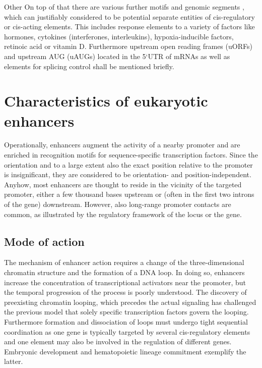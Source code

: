 \begin{mydescription}{0.5cm}
	\item[Other] On top of that there are various further motifs and genomic segments , which can justifiably considered to be potential separate entities of cis-regulatory or cis-acting elements. This includes response elements to a variety of factors like hormones, cytokines (interferones, interleukins), hypoxia-inducible factors, retinoic acid or vitamin D. Furthermore upstream open reading frames (uORFs) and upstream AUG (uAUGs) located in the 5\lq UTR of mRNAs \cite{Iacono2005,Kochetov2008} as well as elements for splicing control\cite{Wang2006} shall be mentioned briefly. 
\end{mydescription} 



\section{Characteristics of eukaryotic enhancers}
\label{chap:i:enhancers:enhancerdef}

Operationally, enhancers augment the activity of a nearby promoter and are enriched in recognition motifs for sequence-specific transcription factors. Since the orientation and to a large extent also the exact position relative to the promoter is insignificant, they are considered to be orientation- and position-independent. Anyhow, most enhancers are thought to reside in the vicinity of the targeted promoter, either a few thousand bases upstream or (often in the first two introns of the gene) downstream. However, also long-range promoter contacts are common\cite{Sanyal2012,Mifsud2015}, as illustrated by the regulatory framework of the  locus \cite{Fulco2016} or the  gene\cite{Lettice2003}. 

\subsection{Mode of action} 
\label{chap:i:enhancers:moa}
The mechanism of enhancer action requires a change of the three-dimensional chromatin structure and the formation of a DNA loop. In doing so, enhancers increase the concentration of transcriptional activators near the promoter, but the temporal progression of the process is poorly understood. The discovery of preexisting chromatin looping, which precedes the actual signaling\cite{Jin2013} has challenged the previous model\cite{Arensbergen2014} that solely specific transcription factors govern the looping\cite{Drissen2004,Vakoc2005}. Furthermore formation and dissociation of loops must undergo tight sequential coordination as one gene is typically targeted by several cis-regulatory elements and one element may also be involved in the regulation of different genes\cite{Hughes2014,Bertolino2016,Javierre2016}. Embryonic development\cite{Ho2015} and hematopoietic lineage commitment\cite{Kieffer-Kwon2013} exemplify the latter. 


